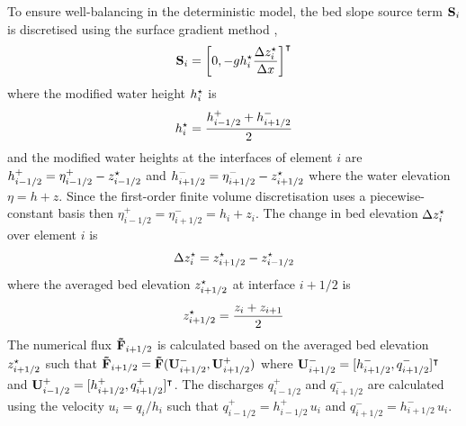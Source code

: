 To ensure well-balancing in the deterministic model, the bed slope source term $\mathbf{S}_i$ is discretised using the surface gradient method \citep{zhou2001},
\begin{align}
\mathbf{S}_i = \left[ 0, -g h^\star_i \frac{\Delta z^\star_i}{\Delta x} \right]^\intercal \label{eqn:source-h}
\end{align}
where the modified water height $h^\star_i$ is
\begin{align}
    h^\star_i = \frac{h_{i-1/2}^+ + h_{i+1/2}^-}{2} \label{eqn:hbar}
\end{align}
and the modified water heights at the interfaces of element $i$ are $h_{i-1/2}^+ = \eta_{i-1/2}^+ - z^\star_{i-1/2}$ and $h_{i+1/2}^- = \eta_{i+1/2}^- - z^\star_{i+1/2}$ where the water elevation $\eta = h + z$.
Since the first-order finite volume discretisation uses a piecewise-constant basis then $\eta_{i-1/2}^+ = \eta_{i+1/2}^- = h_i + z_i$.
The change in bed elevation $\Delta z^\star_i$ over element $i$ is
\begin{align}
    \Delta z^\star_i = z^\star_{i+1/2} - z^\star_{i-1/2} \label{eqn:delta-z}
\end{align}
where the averaged bed elevation $z^\star_{i+1/2}$ at interface $i+1/2$ is
\begin{align}
z^\star_{i+1/2} = \frac{z_i + z_{i+1}}{2} \label{eqn:z-interface}
\end{align}
The numerical flux $\mathbf{\tilde{F}}_{i+1/2}$ is calculated based on the averaged bed elevation $z^\star_{i+1/2}$ such that $\mathbf{\tilde{F}}_{i+1/2} = \mathbf{\tilde{F}}(\mathbf{U}_{i+1/2}^-, \mathbf{U}_{i+1/2}^+)$ where $\mathbf{U}_{i+1/2}^- = [h_{i+1/2}^-, q_{i+1/2}^-]^\intercal$ and $\mathbf{U}_{i-1/2}^+ = [h_{i+1/2}^+, q_{i+1/2}^+]^\intercal$.
The discharges $q_{i-1/2}^+$ and $q_{i+1/2}^-$ are calculated using the velocity $u_i = q_i/h_i$ such that $q_{i-1/2}^+ = h_{i-1/2}^+ \, u_i$ and $q_{i+1/2}^- = h_{i+1/2}^- \, u_i$.

